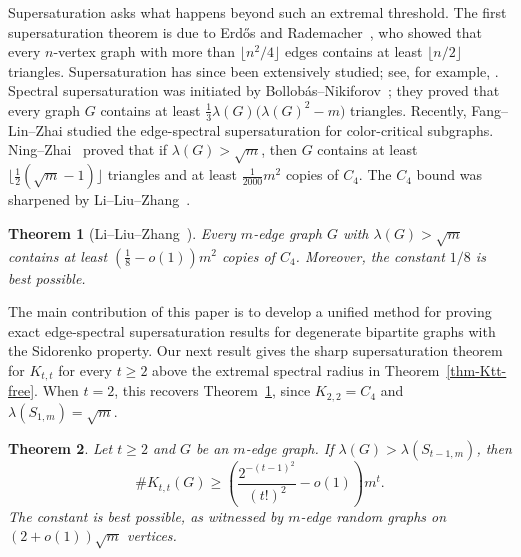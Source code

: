 \documentclass[11pt]{article}
\newtheorem{theorem}{Theorem}[section]
\theoremstyle{definition}
\theoremstyle{plain}
\newcommand{\Ktt}{K_{t,t}}
\begin{document}
Supersaturation asks what happens beyond such an extremal threshold.  The
first supersaturation theorem is due to Erd\H{o}s and
Rademacher~\cite{Erd1962a,Erdos1964}, who showed that every
\(n\)-vertex graph with more than \(\lfloor n^2/4\rfloor\) edges contains
at least \(\lfloor n/2\rfloor\) triangles.  Supersaturation has since
been extensively studied; see, for example,
\cite{LiuPikhurkoStaden2020,Reiher2016,Mubayi2010CountingSubstructuresI,
PikhurkoYilma2017Supersaturation,MY2025}.  Spectral supersaturation was
initiated by Bollob\'as--Nikiforov~\cite{BN2007jctb}; they proved that
every graph \(G\) contains at least
        $\frac13\lambda(G)\bigl(\lambda(G)^2-m\bigr)$
triangles. Recently, 
Fang--Lin--Zhai \cite{FangLinZhai2026} studied 
the edge-spectral supersaturation for color-critical subgraphs.  
Ning--Zhai~\cite{NZ2021,NZ2021b} proved that if
\(\lambda(G)>\sqrt m\), then \(G\) contains at least
\(\lfloor \frac{1}{2}(\sqrt m-1)\rfloor\) triangles and at least
\(\frac1{2000}m^2\) copies of \(C_4\).  The \(C_4\) bound was sharpened
by Li--Liu--Zhang~\cite{LiLiuZhang2025NosalBooksC4}.

\begin{theorem}[Li--Liu--Zhang~\cite{LiLiuZhang2025NosalBooksC4}]
\label{thm:counting-C4}
Every \(m\)-edge graph \(G\) with \(\lambda(G)>\sqrt m\) contains at
least        $\left(\frac18-o(1)\right)m^2$
copies of \(C_4\).  Moreover, the constant \(1/8\) is best possible.
\end{theorem}

The main contribution of this paper 
is to develop a unified method for proving
exact edge-spectral supersaturation results for degenerate bipartite graphs with the Sidorenko property.   
Our next result gives the sharp supersaturation theorem for \(K_{t,t}\) for every $t\ge 2$  
above the extremal spectral radius in Theorem~\ref{thm-Ktt-free}.  When
\(t=2\), this recovers Theorem~\ref{thm:counting-C4}, since
\(K_{2,2}=C_4\) and \(\lambda(S_{1,m})=\sqrt m\).

\begin{theorem}\label{thm:sharp-Ktt}
Let $t\ge 2$ and $G$ be an $m$-edge graph. If $\lambda(G)> \lambda(S_{t-1,m})$, then
\[
   \texttt{\#}\Ktt(G) \ge
   \left( \frac{2^{-(t-1)^2}}{(t!)^2} -o(1)\right)m^t .
\]
The constant is best possible, as witnessed by $m$-edge random graphs on
$(2+o(1))\sqrt m$ vertices.
\end{theorem}
\end{document}
